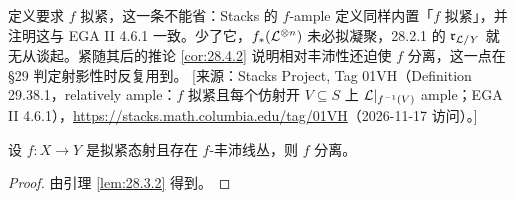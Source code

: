 \begin{yizhu}
定义要求 $f$ 拟紧，这一条不能省：Stacks 的 $f$-ample 定义同样内置「$f$ 拟紧」，并注明这与 EGA II 4.6.1 一致。少了它，$f_*(\mathcal{L}^{\otimes n})$ 未必拟凝聚，28.2.1 的 $\mathfrak r_{\mathcal{L}/Y}$ 就无从谈起。紧随其后的推论 \ref{cor:28.4.2} 说明相对丰沛性还迫使 $f$ 分离，这一点在 §29 判定射影性时反复用到。
[来源：Stacks Project, Tag 01VH（Definition 29.38.1，relatively ample：$f$ 拟紧且每个仿射开 $V\subseteq S$ 上 $\mathcal{L}|_{f^{-1}(V)}$ ample；EGA II 4.6.1），\url{https://stacks.math.columbia.edu/tag/01VH}（2026-11-17 访问）。]
\end{yizhu}

\begin{corollary}\label{cor:28.4.2}
设 $f\colon X\to Y$ 是拟紧态射且存在 $f$-丰沛线丛，则 $f$ 分离。
\end{corollary}

\begin{proof}
由引理 \ref{lem:28.3.2} 得到。
\end{proof}

